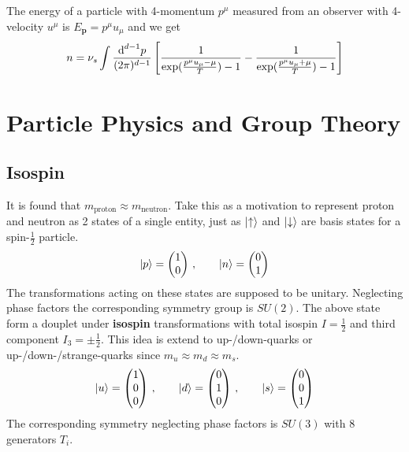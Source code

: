 The energy of a particle with 4-momentum $p^\mu$ measured from an observer with 4-velocity $u^\mu$ is $E_{\mathbf{p}}=p^\mu u_\mu$ and we get
\begin{align}
    n=\nu_s\int\frac{\text{d}^{d-1}p}{(2\pi)^{d-1}}\left[\frac{1}{\exp(\frac{p^\mu u_\mu-\mu}{T})-1}-\frac{1}{\exp(\frac{p^\mu u_\mu+\mu}{T})-1}\right]
\end{align}




\section{Particle Physics and Group Theory}

\subsection{Isospin}

It is found that $m_{\text{proton}}\approx m_{\text{neutron}}$. Take this as a motivation to represent proton and neutron as 2 states of a single entity, just as ${\lvert\uparrow\rangle}$ and ${\lvert\downarrow\rangle}$ are basis states for a spin-$\frac{1}{2}$ particle.
\begin{equation}
    {\lvert p\rangle}=\begin{pmatrix}
        1 \\0
    \end{pmatrix}\,,
    \qquad
    {\lvert n\rangle}=\begin{pmatrix}
        0 \\1
    \end{pmatrix}
\end{equation}
The transformations acting on these states are supposed to be unitary. Neglecting phase factors the corresponding symmetry group is $SU(2)$. The above state form a douplet under \textbf{isospin} transformations with total isospin $I=\frac{1}{2}$ and third component $I_3=\pm\frac{1}{2}$. This idea is extend to up-/down-quarks or up-/down-/strange-quarks since $m_u\approx m_d\approx m_s$.
\begin{equation}
    {\lvert u\rangle}=\begin{pmatrix}
        1 \\0\\0
    \end{pmatrix}\,,\qquad
    {\lvert d\rangle}=\begin{pmatrix}
        0 \\1\\0
    \end{pmatrix}\,,\qquad
    {\lvert s\rangle}=\begin{pmatrix}
        0 \\0\\1
    \end{pmatrix}
\end{equation}
The corresponding symmetry neglecting phase factors is $SU(3)$ with 8 generators $T_i$. \done{}


